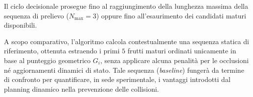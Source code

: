 Il ciclo decisionale prosegue fino al raggiungimento della lunghezza massima della sequenza di prelievo ($N_{\max} = 3$) oppure fino all'esaurimento dei candidati maturi disponibili.

A scopo comparativo, l'algoritmo calcola contestualmente una sequenza statica di riferimento, ottenuta estraendo i primi $5$ frutti maturi ordinati unicamente in base al punteggio geometrico $G_i$, senza applicare alcuna penalità per le occlusioni né aggiornamenti dinamici di stato. Tale sequenza (\textit{baseline}) fungerà da termine di confronto per quantificare, in sede sperimentale, i vantaggi introdotti dal planning dinamico nella prevenzione delle collisioni.
